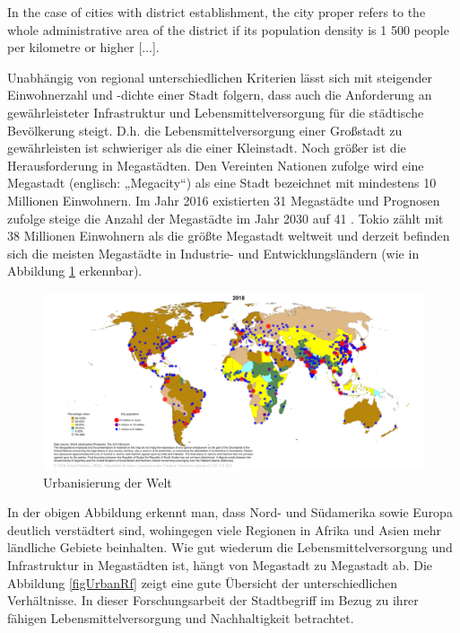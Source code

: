 \documentclass{article}
\begin{document}
\begin{displayquote}
In the case of cities with district establishment, the city proper refers to the whole administrative area of the district if its population density is 1 500 people per kilometre or higher [...]. \cite[S.~2]{UnitedNations2005Table2005} 
\end{displayquote}

Unabhängig von regional unterschiedlichen Kriterien lässt sich mit steigender Einwohnerzahl und -dichte einer Stadt folgern, dass auch die Anforderung an gewährleisteter Infrastruktur und Lebensmittelversorgung für die städtische Bevölkerung steigt. D.h. die Lebensmittelversorgung einer Großstadt zu gewährleisten ist schwieriger als die einer Kleinstadt. Noch größer ist die Herausforderung in Megastädten. Den Vereinten Nationen zufolge wird eine Megastadt (englisch: „Megacity“) als eine Stadt bezeichnet mit mindestens 10 Millionen Einwohnern. Im Jahr 2016 existierten 31 Megastädte und Prognosen zufolge steige die Anzahl der Megastädte im Jahr 2030 auf 41 \cite{UnitedNations2016The2016}. Tokio zählt mit 38 Millionen Einwohnern als die größte Megastadt weltweit und derzeit befinden sich die meisten Megastädte in Industrie- und Entwicklungsländern (wie in Abbildung \ref{figUrban} erkennbar). 

\begin{figure}[h]
\centering
\includegraphics[width=20cm]{image_folder/CityPop_Urban.png}
\caption{Urbanisierung der Welt}
\label{figUrban}
\end{figure}

In der obigen Abbildung erkennt man, dass Nord- und Südamerika sowie Europa deutlich verstädtert sind, wohingegen viele Regionen in Afrika und Asien mehr ländliche Gebiete beinhalten. Wie gut wiederum die Lebensmittelversorgung und Infrastruktur in Megastädten ist, hängt von Megastadt zu Megastadt ab. Die Abbildung \ref{figUrbanRf} zeigt eine gute Übersicht der unterschiedlichen Verhältnisse. In dieser Forschungsarbeit der Stadtbegriff im Bezug zu ihrer fähigen Lebensmittelversorgung und Nachhaltigkeit betrachtet.
\end{document}
